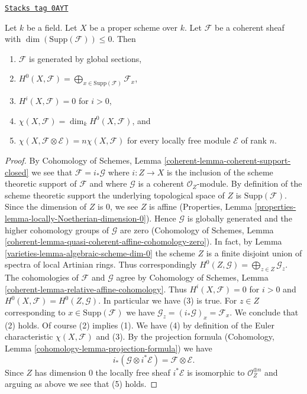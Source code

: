 \begin{lemma}
\label{varieties-lemma-chi-tensor-finite}
\href{https://stacks.math.columbia.edu/tag/0AYT}{\texttt{Stacks tag 0AYT}}

Let $k$ be a field. Let $X$ be a proper scheme over $k$. Let $\mathcal{F}$
be a coherent sheaf with $\dim(\text{Supp}(\mathcal{F})) \leq 0$.
Then
\begin{enumerate}
\item $\mathcal{F}$ is generated by global sections,
\item $H^0(X, \mathcal{F}) =
\bigoplus_{x \in \text{Supp}(\mathcal{F})} \mathcal{F}_x$,
\item $H^i(X, \mathcal{F}) = 0$ for $i > 0$,
\item $\chi(X, \mathcal{F}) = \dim_k H^0(X, \mathcal{F})$, and
\item
$\chi(X, \mathcal{F} \otimes \mathcal{E}) = n\chi(X, \mathcal{F})$
for every locally free module $\mathcal{E}$ of rank $n$.
\end{enumerate}
\end{lemma}

\begin{proof}

By Cohomology of Schemes, Lemma \ref{coherent-lemma-coherent-support-closed}
we see that $\mathcal{F} = i_*\mathcal{G}$ where $i : Z \to X$ is the inclusion
of the scheme theoretic support of $\mathcal{F}$ and where $\mathcal{G}$
is a coherent $\mathcal{O}_Z$-module. By definition of the scheme theoretic
support the underlying topological space of $Z$ is $\text{Supp}(\mathcal{F})$.
Since the dimension of $Z$ is $0$, we see $Z$ is affine (Properties, Lemma
\ref{properties-lemma-locally-Noetherian-dimension-0}).
Hence $\mathcal{G}$ is globally generated and the higher
cohomology groups of $\mathcal{G}$ are zero
(Cohomology of Schemes, Lemma
\ref{coherent-lemma-quasi-coherent-affine-cohomology-zero}).
In fact, by Lemma \ref{varieties-lemma-algebraic-scheme-dim-0}
the scheme $Z$ is a finite disjoint union of spectra
of local Artinian rings. Thus correspondingly
$H^0(Z, \mathcal{G}) = \bigoplus_{z \in Z} \mathcal{G}_z$.
The cohomologies of $\mathcal{F}$ and $\mathcal{G}$ agree by
Cohomology of Schemes, Lemma \ref{coherent-lemma-relative-affine-cohomology}.
Thus $H^i(X, \mathcal{F}) = 0$ for $i > 0$ and
$H^0(X, \mathcal{F}) = H^0(Z, \mathcal{G})$.
In particular we have (3) is true.
For $z \in Z$ corresponding to $x \in \text{Supp}(\mathcal{F})$
we have $\mathcal{G}_z = (i_*\mathcal{G})_x = \mathcal{F}_x$.
We conclude that (2) holds. Of course (2) implies (1).
We have (4) by definition of the Euler characteristic $\chi(X, \mathcal{F})$
and (3). By the projection formula
(Cohomology, Lemma \ref{cohomology-lemma-projection-formula}) we have
$$
i_*(\mathcal{G} \otimes i^*\mathcal{E}) = \mathcal{F} \otimes \mathcal{E}.
$$
Since $Z$ has dimension $0$ the locally free sheaf $i^*\mathcal{E}$
is isomorphic to $\mathcal{O}_Z^{\oplus n}$ and arguing as above
we see that (5) holds.
\end{proof}

